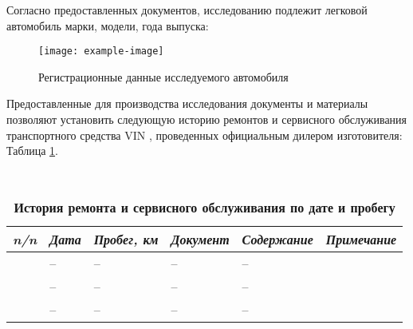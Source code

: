Согласно предоставленных документов,  исследованию подлежит легковой автомобиль  марки, модели, года выпуска:
\begin{figure}[H]
	\centering
	\texttt{[image: example-image]}
	\caption{Регистрационные данные исследуемого автомобиля}
\end{figure}


%
Предоставленные для производства исследования документы и материалы позволяют установить следующую историю ремонтов и сервисного обслуживания  транспортного средства VIN \vin, проведенных официальным дилером изготовителя: Таблица \ref{tab:hist}.
		{\footnotesize \
			\begin{longtable}[h]{m{3mm}|m{14mm}|m{13mm}|m{35mm}|m{55mm}|m{18mm}}
				\caption[]{\footnotesize {\textbf{История ремонта и сервисного обслуживания по дате и пробегу}}} \label{tab:hist} \\ \hline
				\textit{\textbf{n/n}} 
				&\textit{\textbf{Дата}} 
				&\textit{\textbf{Пробег, км}}
				&\textit{\textbf{Документ}} 
				&\textit{\textbf{Содержание}} 
				&\textit{\textbf{Примечание}}\\ \hline \endhead
				
				\Rownum & -- & -- & -- & -- \\
				\hline
				\Rownum & -- & -- & -- & -- \\
				\hline
				\Rownum & -- & -- & -- & -- \\
				\hline
				
				
		\end{longtable}}\setcounter{rownum}{0}
		
